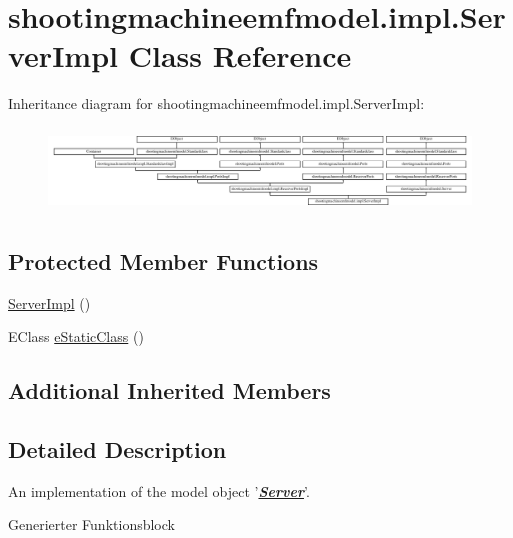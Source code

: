 \hypertarget{classshootingmachineemfmodel_1_1impl_1_1_server_impl}{\section{shootingmachineemfmodel.\-impl.\-Server\-Impl Class Reference}
\label{classshootingmachineemfmodel_1_1impl_1_1_server_impl}
}
Inheritance diagram for shootingmachineemfmodel.\-impl.\-Server\-Impl\-:\begin{figure}[H]
\begin{center}
\leavevmode
\includegraphics[height=2.247492cm]{classshootingmachineemfmodel_1_1impl_1_1_server_impl}
\end{center}
\end{figure}
\subsection*{Protected Member Functions}
\begin{DoxyCompactItemize}
\item 
\hyperlink{classshootingmachineemfmodel_1_1impl_1_1_server_impl_ae3a5e3b5a4216991c178e07882549c1c}{Server\-Impl} ()
\item 
E\-Class \hyperlink{classshootingmachineemfmodel_1_1impl_1_1_server_impl_ab4c753d53331e3fb0019a9fc8a02c068}{e\-Static\-Class} ()
\end{DoxyCompactItemize}
\subsection*{Additional Inherited Members}


\subsection{Detailed Description}
An implementation of the model object '{\itshape {\bfseries \hyperlink{interfaceshootingmachineemfmodel_1_1_server}{Server}}}'.

Generierter Funktionsblock 

